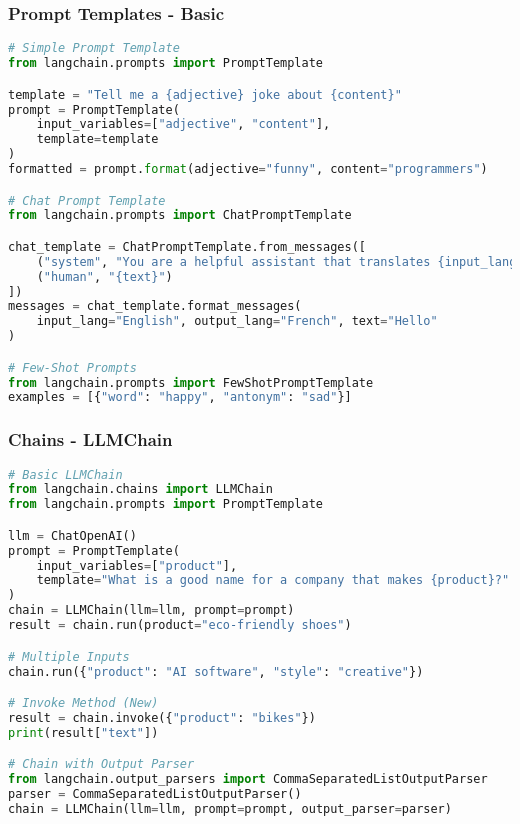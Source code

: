 \begin{frame}[fragile]\frametitle{Prompt Templates - Basic}
\begin{lstlisting}[language=python,basicstyle=\tiny]
# Simple Prompt Template
from langchain.prompts import PromptTemplate

template = "Tell me a {adjective} joke about {content}"
prompt = PromptTemplate(
    input_variables=["adjective", "content"],
    template=template
)
formatted = prompt.format(adjective="funny", content="programmers")

# Chat Prompt Template
from langchain.prompts import ChatPromptTemplate

chat_template = ChatPromptTemplate.from_messages([
    ("system", "You are a helpful assistant that translates {input_lang} to {output_lang}"),
    ("human", "{text}")
])
messages = chat_template.format_messages(
    input_lang="English", output_lang="French", text="Hello"
)

# Few-Shot Prompts
from langchain.prompts import FewShotPromptTemplate
examples = [{"word": "happy", "antonym": "sad"}]
\end{lstlisting}
\end{frame}

\begin{frame}[fragile]\frametitle{Chains - LLMChain}
\begin{lstlisting}[language=python,basicstyle=\tiny]
# Basic LLMChain
from langchain.chains import LLMChain
from langchain.prompts import PromptTemplate

llm = ChatOpenAI()
prompt = PromptTemplate(
    input_variables=["product"],
    template="What is a good name for a company that makes {product}?"
)
chain = LLMChain(llm=llm, prompt=prompt)
result = chain.run(product="eco-friendly shoes")

# Multiple Inputs
chain.run({"product": "AI software", "style": "creative"})

# Invoke Method (New)
result = chain.invoke({"product": "bikes"})
print(result["text"])

# Chain with Output Parser
from langchain.output_parsers import CommaSeparatedListOutputParser
parser = CommaSeparatedListOutputParser()
chain = LLMChain(llm=llm, prompt=prompt, output_parser=parser)
\end{lstlisting}
\end{frame}

